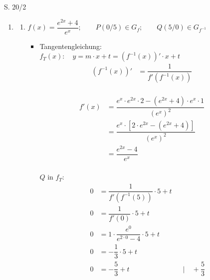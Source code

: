 \begin{Exercise}{S. 20/2}{}
    \begin{enumerate}
        \item [2.]\begin{enumerate}[label=\alph*)]
            \item[a)] {
                $f(x) = \dfrac{e^{2x}+ 4}{e^{x}}; \qquad P(0/5) \in G_{f}; \qquad Q(5/0) \in G_{f^{-1}}$\\[-2.0ex]
                \begin{itemize}[leftmargin=*]
                    \item Tangentengleichung: \\[2.0ex]{
                        $f_{T}(x): \quad y = m \cdot x + t = \left(f^{-1}(x)\right)' \cdot x + t$\\
                        \vspace{-2.0ex}
                        \begin{align*}
                            \left(f^{-1}(x)\right)' &= \dfrac{1}{f'\left(f^{-1}(x)\right)} &&
                        \end{align*}\\[-2.0ex]
                        \begin{align*}
                            f'(x) &= \dfrac{e^{x} \cdot e^{2x} \cdot 2 - \left(e^{2x} + 4 \right) \cdot e^{x} \cdot 1}{\left(e^{x}\right)^2} &&\\[1.5ex]
                            &= \dfrac{e^{x} \cdot \left[2 \cdot e^{2x} - \left(e^{2x} + 4 \right) \right]}{\left(e^{x}\right)^2} &&\\[1.5ex]
                            &= \dfrac{e^{2x} - 4}{e^{x}} &&
                        \end{align*}\\[-2.0ex]
                        $Q$ in $f_{T}$: \\[-2.0ex]
                        \begin{align*}
                            0 &= \dfrac{1}{f'\left(f^{-1}(5)\right)} \cdot 5 + t &&\\[1.5ex]
                            0 &= \dfrac{1}{f'(0)} \cdot 5 + t &&\\[1.5ex]
                            0 &= 1 \cdot \dfrac{e^{0}}{e^{2 \cdot 0} - 4} \cdot 5 + t &&\\[1.5ex]
                            0 &= - \dfrac{1}{3} \cdot 5 + t &&\\[1.5ex]
                            0 &= -\dfrac{5}{3} + t &&| \quad + \dfrac{5}{3}\\[1.5ex]

\end{align*}}
\end{itemize}}
\end{enumerate}
\end{enumerate}
\end{Exercise}

